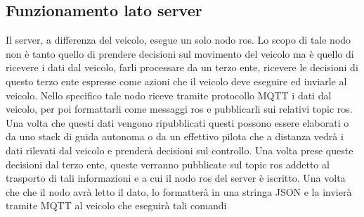 \subsection{Funzionamento lato server}
\noindent Il server, a differenza del veicolo, esegue un solo nodo ros. Lo scopo di tale nodo non è tanto quello di prendere decisioni sul movimento del veicolo ma è quello di ricevere i dati dal veicolo, farli processare da un terzo ente, ricevere le decisioni di questo terzo ente espresse come azioni che il veicolo deve eseguire ed inviarle al veicolo.
\noindent Nello specifico tale nodo riceve tramite protocollo MQTT i dati dal veicolo, per poi formattarli come messaggi ros e pubblicarli sui relativi topic ros. Una volta che questi dati vengono ripubblicati questi possono essere elaborati o da uno stack di guida autonoma o da un effettivo pilota che a distanza vedrà i dati rilevati dal veicolo e prenderà decisioni sul controllo.
\noindent Una volta prese queste decisioni dal terzo ente, queste verranno pubblicate sul topic ros addetto al trasporto di tali informazioni e a cui il nodo ros del server è iscritto. Una volta che che il nodo avrà letto il dato, lo formatterà in una stringa JSON e la invierà tramite MQTT al veicolo che eseguirà tali comandi
